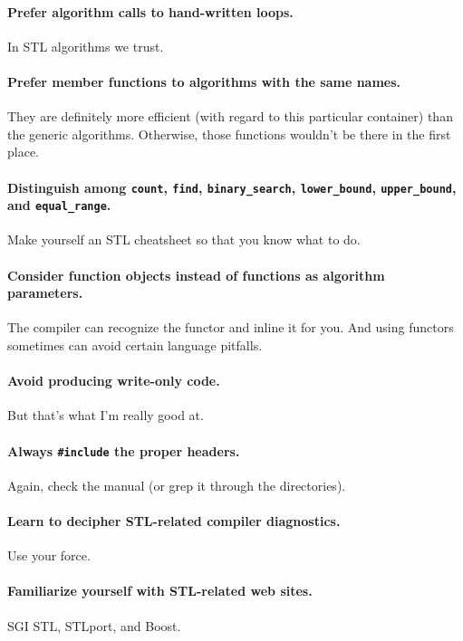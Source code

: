\documentclass{article}
\begin{document}
\paragraph{Prefer algorithm calls to hand-written loops.}  In STL
algorithms we trust.

\paragraph{Prefer member functions to algorithms with the same names.} They are
definitely more efficient (with regard to this particular container) than the
generic algorithms.  Otherwise, those functions wouldn't be there in the first
place.

\paragraph{Distinguish among {\tt count}, {\tt find}, {\tt binary\_search},
{\tt lower\_bound}, {\tt upper\_bound}, and {\tt equal\_range}.}  Make yourself
an STL cheatsheet so that you know what to do.

\paragraph{Consider function objects instead of functions as algorithm
parameters.} The compiler can recognize the functor and inline it for you.  And
using functors sometimes can avoid certain language pitfalls.

\paragraph{Avoid producing write-only code.}  But that's what I'm really good
at.

\paragraph{Always {\tt \#include} the proper headers.} Again, check the manual
(or grep it through the directories).

\paragraph{Learn to decipher STL-related compiler diagnostics.}
Use your force.

\paragraph{Familiarize yourself with STL-related web sites.} SGI STL, STLport,
and Boost.
\end{document}
